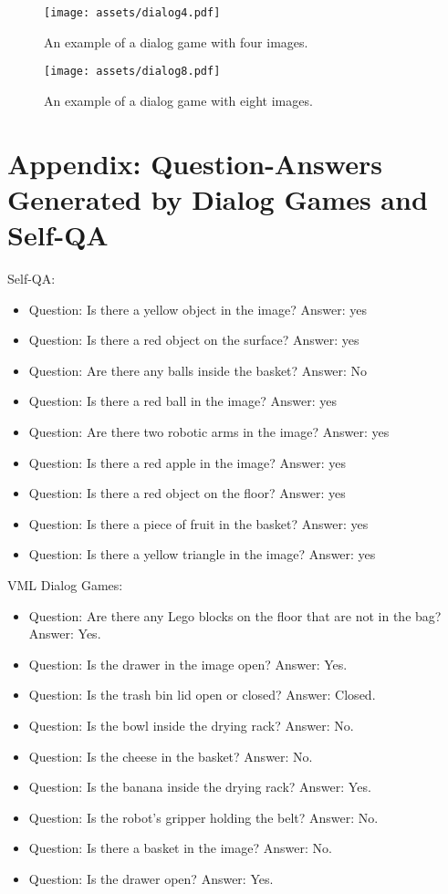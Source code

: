 \begin{figure}[t]
    \centering
    \texttt{[image: assets/dialog4.pdf]}
    \caption{An example of a dialog game with four images.}
    \label{fig:dialog4}
\end{figure}

\begin{figure}[t]
    \centering
    \texttt{[image: assets/dialog8.pdf]}
    \caption{An example of a dialog game with eight images.}
    \label{fig:dialog8}
\end{figure}

\section{Appendix: Question-Answers Generated by Dialog Games and Self-QA}
\label{sec:qa-examples}

Self-QA:
\begin{itemize}
    \item Question: Is there a yellow object in the image? Answer: yes
    \item Question: Is there a red object on the surface? Answer: yes
    \item Question: Are there any balls inside the basket? Answer: No
    \item Question: Is there a red ball in the image? Answer: yes
    \item Question: Are there two robotic arms in the image? Answer: yes
    \item Question: Is there a red apple in the image? Answer: yes
    \item Question: Is there a red object on the floor? Answer: yes
    \item Question: Is there a piece of fruit in the basket? Answer: yes
    \item Question: Is there a yellow triangle in the image? Answer: yes
\end{itemize}

VML Dialog Games:
\begin{itemize}
    \item Question: Are there any Lego blocks on the floor that are not in the bag? Answer: Yes.
    \item Question: Is the drawer in the image open? Answer: Yes.
    \item Question: Is the trash bin lid open or closed? Answer: Closed.
    \item Question: Is the bowl inside the drying rack? Answer: No.
    \item Question: Is the cheese in the basket? Answer: No.
    \item Question: Is the banana inside the drying rack? Answer: Yes.
    \item Question: Is the robot's gripper holding the belt? Answer: No.
    \item Question: Is there a basket in the image? Answer: No.
    \item Question: Is the drawer open? Answer: Yes.
\end{itemize}

